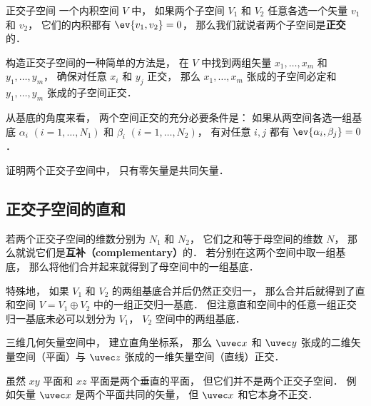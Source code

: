 
\begin{issues}
\issueTODO
\end{issues}


\begin{definition}{正交子空间}
一个内积空间 $V$ 中， 如果两个子空间 $V_1$ 和 $V_2$ 任意各选一个矢量 ${v_1}$ 和 ${v_2}$， 它们的内积都有 $\ev{v_1, v_2} = 0$， 那么我们就说者两个子空间是\textbf{正交}的．
\end{definition}

构造正交子空间的一种简单的方法是， 在 $V$ 中找到两组矢量 $x_1, \dots, x_m$ 和 $y_1, \dots, y_m$， 确保对任意 $x_i$ 和 $y_j$ 正交， 那么 $x_1, \dots, x_m$ 张成的子空间必定和 $y_1, \dots, y_m$ 张成的子空间正交．

\begin{theorem}{}
从基底的角度来看， 两个空间正交的充分必要条件是： 如果从两空间各选一组基底 ${\alpha_i}$ $(i = 1, \dots, N_1)$ 和 ${\beta_i}$ $(i = 1, \dots, N_2)$， 有对任意 $i, j$ 都有 $\ev{\alpha_i, \beta_j} = 0$．
\end{theorem}

\begin{exercise}{}
证明两个正交子空间中， 只有零矢量是共同矢量．
\end{exercise}

\subsection{正交子空间的直和}

若两个正交子空间的维数分别为 $N_1$ 和 $N_2$， 它们之和等于母空间的维数 $N$， 那么就说它们是\textbf{互补（complementary）}的． 若分别在这两个空间中取一组基底， 那么将他们合并起来就得到了母空间中的一组基底．

特殊地， 如果 $V_1$ 和 $V_2$ 的两组基底合并后仍然正交归一， 那么合并后就得到了直和空间 $V = V_1 \oplus V_2$ 中的一组正交归一基底． 但注意直和空间中的任意一组正交归一基底未必可以划分为 $V_1$， $V_2$ 空间中的两组基底．

\begin{example}{}
三维几何矢量空间中， 建立直角坐标系， 那么 $\uvec x$ 和 $\uvec y$ 张成的二维矢量空间（平面）与 $\uvec z$ 张成的一维矢量空间（直线）正交．
\end{example}

\begin{example}{}
虽然 $xy$ 平面和 $xz$ 平面是两个垂直的平面， 但它们并不是两个正交子空间． 例如矢量 $\uvec x$ 是两个平面共同的矢量， 但 $\uvec x$ 和它本身不正交．
\end{example}

